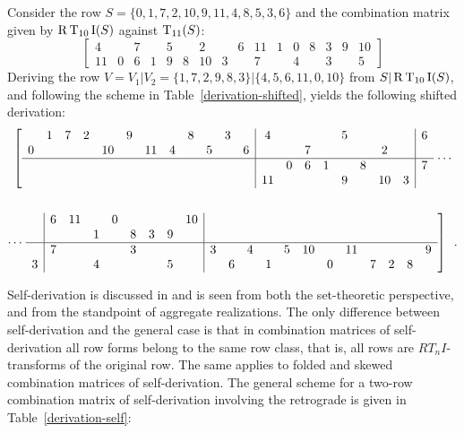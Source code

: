 \begin{example}
    \cite[216]{Starr1984}
    \label{ex:derivation-shifted}
    Consider the row $S = \{ 0, 1, 7, 2, 10, 9, 11, 4, 8, 5, 3, 6 \}$ and the combination matrix given by $\operatorname{R}\operatorname{T}_{10}\operatorname{I}(S)$ against $\operatorname{T}_{11}(S)$:
    \begin{equation}
        \left[
        \begin{array}{cccccccc|cccccccc}
            4 && 7 && 5 && 2 && 6 & 11 & 1 & 0 & 8 & 3 & 9 & 10 \\
            11 & 0 & 6 & 1 & 9 & 8 & 10 & 3 && 7 && 4 && 3 && 5
        \end{array}
        \right]
    \end{equation}
    Deriving the row $V = V_1 | V_2 = \{ 1, 7, 2, 9, 8, 3 \} | \{ 4, 5, 6, 11, 0, 10 \}$ from $S | \operatorname{R}\operatorname{T}_{10}\operatorname{I}(S)$, and following the scheme in Table~\ref{derivation-shifted}, yields the following shifted derivation:
    \begin{multline}
        \left[
        \begin{array}{cccccccccccc|cccccccc|c}
            & 1 & 7 & 2 && 9 &&& 8 && 3 && 4 &&&& 5 &&&& 6 \\
            0 &&&& 10 && 11 & 4 && 5 && 6 & && 7 &&&& 2 && \\
            \hline
            &&&&&&&&&&&& & 0 & 6 & 1 && 8 &&& 7 \\
            &&&&&&&&&&&& 11 &&&& 9 && 10 & 3 &
        \end{array}
        \right. \cdots \\\\
        \cdots \left. \begin{array}{c|cccccccc|cccccccccccc}
            & 6 & 11 && 0 &&&& 10 &&&&&&&&&&& \\
            & && 1 && 8 & 3 & 9 & &&&&&&&&&&& \\
            \hline
            & 7 &&&& 3 &&& & 3 && 4 && 5 & 10 && 11 &&&& 9 \\
            3 &&& 4 &&&& 5 & && 6 && 1 &&& 0 && 7 & 2 & 8
        \end{array} \right] \enspace.
    \end{multline}
\end{example}

Self-derivation is discussed in \cite[217, 226]{Starr1984} and is seen from both the set-theoretic perspective, and from the standpoint of aggregate realizations. The only difference between self-derivation and the general case is that in combination matrices of self-derivation all row forms belong to the same row class, that is, all rows are $RT_nI$-transforms of the original row. The same applies to folded and skewed combination matrices of self-derivation. The general scheme for a two-row combination matrix of self-derivation involving the retrograde is given in Table~\ref{derivation-self}:

